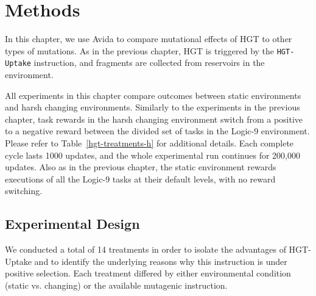\documentclass[PhD]{msu-thesis}
\begin{document}
\section{Methods}
In this chapter, we use Avida to compare mutational effects of HGT to other types of mutations. As in the previous chapter, HGT is triggered by the \texttt{HGT-Uptake} instruction, and fragments are collected from reservoirs in the environment. 

All experiments in this chapter compare outcomes between static environments and harsh changing environments. Similarly to the experiments in the previous chapter, task rewards in the harsh changing environment switch from a positive to a negative reward between the divided set of tasks in the Logic-9 environment. Please refer to Table~\ref{hgt-treatments-h} for additional details. Each complete cycle lasts 1000 updates, and the whole experimental run continues for 200,000 updates.
Also as in the previous chapter, the static environment rewards executions of all the Logic-9 tasks at their default levels, with no reward switching.

\subsection{Experimental Design}

We conducted a total of 14 treatments in order to isolate the advantages of HGT-Uptake and to identify the underlying reasons why this instruction is under positive selection. Each treatment differed by either environmental condition (static vs. changing) or the available mutagenic instruction.
\end{document}
